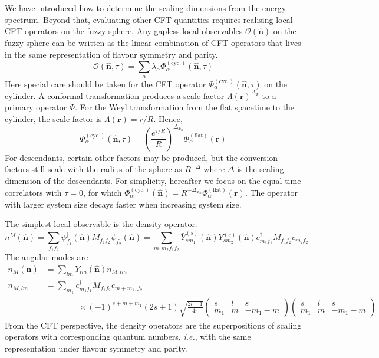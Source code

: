 \documentclass{timesjhep}
\begin{document}
We have introduced how to determine the scaling dimensions from the energy spectrum. Beyond that, evaluating other CFT quantities requires realising local CFT operators on the fuzzy sphere. Any gapless local observables $\mathscr{O}(\hat{\mathbf{n}})$ on the fuzzy sphere can be written as the linear combination of CFT operators that lives in the same representation of flavour symmetry and parity. 
\begin{equation}
    \mathscr{O}(\hat{\mathbf{n}},\tau)=\sum_\alpha \lambda_\alpha\Phi^{(\mathrm{cyc.})}_\alpha(\hat{\mathbf{n}},\tau) 
\end{equation} 
Here special care should be taken for the CFT operator $\Phi^{(\mathrm{cyc.})}_\alpha(\hat{\mathbf{n}},\tau)$ on the cylinder. A conformal transformation produces a scale factor $\Lambda(\mathbf{r})^{\Delta_\Phi}$ to a primary operator $\Phi$. For the Weyl transformation from the flat spacetime to the cylinder, the scale factor is $\Lambda(\mathbf{r})=r/R$. Hence, 
\begin{equation}
    \Phi^{(\mathrm{cyc.})}_\alpha(\hat{\mathbf{n}},\tau)=\left(\frac{e^{\tau/R}}{R}\right)^{\Delta_{\Phi_\alpha}}\Phi_\alpha^{\mathrm{(flat)}}(\mathbf{r})
\end{equation}
For descendants, certain other factors may be produced, but the conversion factors still scale with the radius of the sphere as $R^{-\Delta}$ where $\Delta$ is the scaling dimension of the descendants. For simplicity, hereafter we focus on the equal-time correlators with $\tau=0$, for which $\Phi^{(\mathrm{cyc.})}_\alpha(\hat{\mathbf{n}})=R^{-\Delta_{\Phi_\alpha}}\Phi_\alpha^{\mathrm{(flat)}}(\mathbf{r})$. The operator with larger system size decays faster when increasing system size. 

The simplest local observable is the density operator. 
\begin{equation}
    n^M(\hat{\mathbf{n}})=\sum_{f_1f_2}\psi_{f_1}^\dagger(\hat{\mathbf{n}})M_{f_1f_2}\psi_{f_2}(\hat{\mathbf{n}})=\sum_{m_1m_2f_1f_2}\bar{Y}^{(s)}_{sm_1}(\hat{\mathbf{n}})Y^{(s)}_{sm_2}(\hat{\mathbf{n}})c^\dagger_{m_1f_1}M_{f_1f_2}c_{m_2f_2}
\end{equation} 
The angular modes are 
\begin{align}
    n_M(\hat{\mathbf{n}})&=\sum_{lm}Y_{lm}(\hat{\mathbf{n}})n_{M,lm}\nonumber\\
    n_{M,lm}&=\sum_{m_1}c^\dagger_{m_1f_1}M_{f_1f_2}c_{m+m_1,f_2}\nonumber\\
    &\qquad\qquad\times(-1)^{s+m+m_1}(2s+1)\sqrt{\frac{2l+1}{4\pi}}\begin{pmatrix}s&l&s\\m_1&m&-m_1-m\end{pmatrix}\begin{pmatrix}s&l&s\\m_1&m&-m_1-m\end{pmatrix} 
\end{align}
From the CFT perspective, the density operators are the superpositions of scaling operators with corresponding quantum numbers, \textit{i.e.}, with the same representation under flavour symmetry and parity. 
\end{document}
